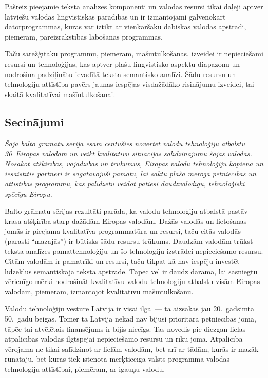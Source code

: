 \begin{multicols}{2}
Pašreiz pieejamie teksta analīzes komponenti un valodas resursi tikai daļēji aptver latviešu valodas lingvistiskās parādības un ir izmantojami galvenokārt datorprogrammās, kuras var iztikt ar vienkāršāku dabiskās valodas apstrādi, piemēram, pareizrakstības labošanas programmās.

Taču sarežģītāku programmu, piemēram, mašīntulkošanas, izveidei ir nepieciešami resursi un tehnoloģijas, kas aptver plašu lingvistisko aspektu diapazonu un nodrošina padziļinātu ievadītā teksta semantisko analīzi.
Šādu resursu un tehnoloģiju attīstība pavērs jaunas iespējas visdažādāko risinājumu izveidei, tai skaitā kvalitatīvai mašīntulkošanai.

\subsection{Secinājumi}

\emph{Šajā balto grāmatu sērijā esam centušies novērtēt valodu tehnoloģiju atbalstu 30~Eiropas valodām un veikt kvalitatīvu situācijas salīdzinājumu šajās valodās.  Nosakot atšķirības, vajadzības un trūkumus, Eiropas valodu tehnoloģiju kopiena un iesaistītie partneri ir sagatavojuši pamatu, lai sāktu plaša mēroga pētniecības un attīstības programmu, kas palīdzētu veidot patiesi daudzvalodīgu, tehnoloģiski spēcīgu Eiropu.}

Balto grāmatu sērijas rezultāti parāda, ka valodu tehnoloģiju atbalstā pastāv krasa atšķirība starp dažādām Eiropas valodām.
Dažās valodās un lietošanas jomās ir pieejama kvalitatīva programmatūra un resursi, taču citās valodās (parasti ``mazajās'') ir būtisks šādu resursu trūkums.
Daudzām valodām trūkst teksta analīzes pamattehnoloģiju un šo tehnoloģiju izstrādei nepieciešamo resursu.
Citām valodām ir pamatrīki un resursi, taču tikpat kā nav iespēju investēt līdzekļus semantiskajā teksta apstrādē.
Tāpēc vēl ir daudz darāmā, lai sasniegtu vērienīgo mērķi nodrošināt kvalitatīvu valodu tehnoloģiju atbalstu visām Eiropas valodām, piemēram, izmantojot kvalitatīvu mašīntulkošanu.

Valodu tehnoloģiju vēsture Latvijā ir visai ilga~--- tā aizsākās jau 20.~gadsimta 50.~gadu beigās.
Tomēr tā Latvijā nekad nav bijusi prioritāra pētniecības joma, tāpēc tai atvēlētais finansējums ir bijis niecīgs.
Tas novedis pie diezgan lielas atpalicības valodas ilgtspējai nepieciešamo resursu un rīku jomā. 
Atpalicība vērojama ne tikai salīdzinot ar lielām valodām, bet arī ar tādām, kurās ir mazāk runātāju, bet kurās tiek īstenota mērķtiecīga valsts programma valodas tehnoloģiju attīstībai, piemēram, ar igauņu valodu.


\end{multicols}
